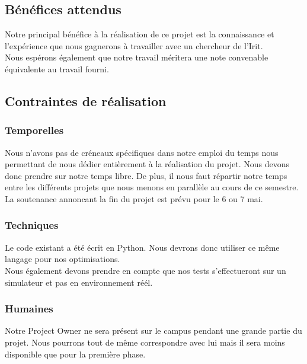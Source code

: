 \documentclass{article}
\begin{document}
\subsection{Bénéfices attendus}
Notre principal bénéfice à la réalisation de ce projet est la connaissance et l'expérience que nous gagnerons à travailler avec un chercheur de l'Irit. \\
Nous espérons également que notre travail méritera une note convenable équivalente au travail fourni.
\subsection{Contraintes de réalisation}
\subsubsection{Temporelles}
Nous n'avons pas de créneaux spécifiques dans notre emploi du temps nous permettant de nous dédier entièrement à la réalisation du projet. Nous devons donc prendre sur notre temps libre. De plus, il nous faut répartir notre temps entre les différents projets que nous menons en parallèle au cours de ce semestre.\\
La soutenance annoncant la fin du projet est prévu pour le 6 ou 7 mai.


\subsubsection{Techniques}
Le code existant a été écrit en Python. Nous devrons donc utiliser ce même langage pour nos optimisations. \\
Nous également devons prendre en compte que nos tests s'effectueront sur un simulateur et pas en environnement réél.
\subsubsection{Humaines}
Notre Project Owner ne sera présent sur le campus pendant une grande partie du projet. Nous pourrons tout de même correspondre avec lui mais il sera moins disponible que pour la première phase.

\end{document}
